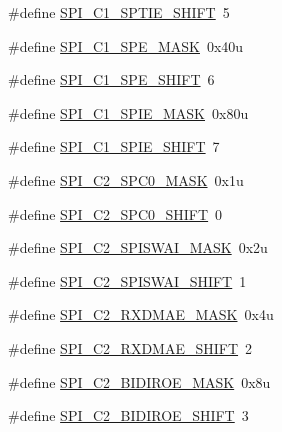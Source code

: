 \begin{DoxyCompactItemize}
\item 
\#define \hyperlink{group___s_p_i___register___masks_gae79e5ea53e13f0697322235e9bb3e005}{S\+P\+I\+\_\+\+C1\+\_\+\+S\+P\+T\+I\+E\+\_\+\+S\+H\+I\+FT}~5
\item 
\#define \hyperlink{group___s_p_i___register___masks_gabbe954288bbd6dcd564064de90d1b414}{S\+P\+I\+\_\+\+C1\+\_\+\+S\+P\+E\+\_\+\+M\+A\+SK}~0x40u
\item 
\#define \hyperlink{group___s_p_i___register___masks_ga21a79703e2147332b7234f62615c2c77}{S\+P\+I\+\_\+\+C1\+\_\+\+S\+P\+E\+\_\+\+S\+H\+I\+FT}~6
\item 
\#define \hyperlink{group___s_p_i___register___masks_gaaa0dbb3306041f89299298e64d7b7a58}{S\+P\+I\+\_\+\+C1\+\_\+\+S\+P\+I\+E\+\_\+\+M\+A\+SK}~0x80u
\item 
\#define \hyperlink{group___s_p_i___register___masks_gacd5c8f15ee05357d76591989eb035d19}{S\+P\+I\+\_\+\+C1\+\_\+\+S\+P\+I\+E\+\_\+\+S\+H\+I\+FT}~7
\item 
\#define \hyperlink{group___s_p_i___register___masks_gaaaeac694d1d42228524e96040a9ddf53}{S\+P\+I\+\_\+\+C2\+\_\+\+S\+P\+C0\+\_\+\+M\+A\+SK}~0x1u
\item 
\#define \hyperlink{group___s_p_i___register___masks_gabd2530719a946cda56c285547a8239ee}{S\+P\+I\+\_\+\+C2\+\_\+\+S\+P\+C0\+\_\+\+S\+H\+I\+FT}~0
\item 
\#define \hyperlink{group___s_p_i___register___masks_ga05643847feabba49c1e7e16044278d08}{S\+P\+I\+\_\+\+C2\+\_\+\+S\+P\+I\+S\+W\+A\+I\+\_\+\+M\+A\+SK}~0x2u
\item 
\#define \hyperlink{group___s_p_i___register___masks_gae756e76f39bea0b21aac347ba75fd16c}{S\+P\+I\+\_\+\+C2\+\_\+\+S\+P\+I\+S\+W\+A\+I\+\_\+\+S\+H\+I\+FT}~1
\item 
\#define \hyperlink{group___s_p_i___register___masks_gab50dca40cbee0b9359dd2f27fa0920da}{S\+P\+I\+\_\+\+C2\+\_\+\+R\+X\+D\+M\+A\+E\+\_\+\+M\+A\+SK}~0x4u
\item 
\#define \hyperlink{group___s_p_i___register___masks_ga5460ff43cfcee3211e76bb6ef2321563}{S\+P\+I\+\_\+\+C2\+\_\+\+R\+X\+D\+M\+A\+E\+\_\+\+S\+H\+I\+FT}~2
\item 
\#define \hyperlink{group___s_p_i___register___masks_gab4fb07392c6e708f3950587b02109f2f}{S\+P\+I\+\_\+\+C2\+\_\+\+B\+I\+D\+I\+R\+O\+E\+\_\+\+M\+A\+SK}~0x8u
\item 
\#define \hyperlink{group___s_p_i___register___masks_ga228238321389e2344fa3c837fe55492e}{S\+P\+I\+\_\+\+C2\+\_\+\+B\+I\+D\+I\+R\+O\+E\+\_\+\+S\+H\+I\+FT}~3
\item 

\end{DoxyCompactItemize}
